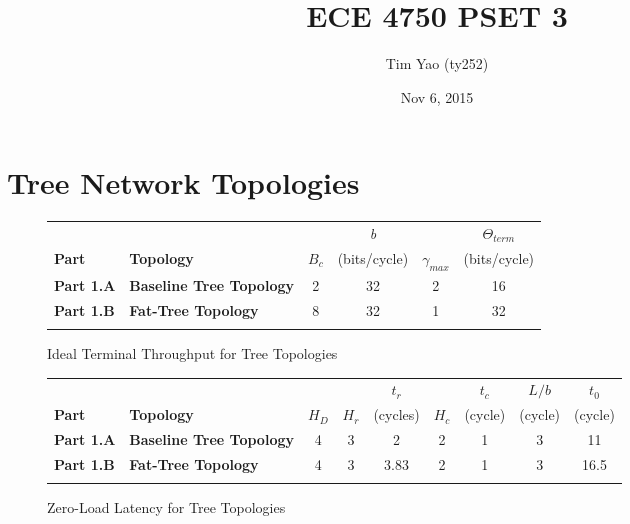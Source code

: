 \documentclass[10pt]{article}
\title{ECE 4750 PSET 3}
\author{Tim Yao (ty252)}
\date{Nov 6, 2015}
\begin{document}
\maketitle
\newcommand*{\tableindent}{\hspace*{0.3cm}}%

\section{Tree Network Topologies} 

\begin{figure}[H]
\centering
\begin{tabular}{@{\extracolsep{3pt}}llcccc@{}}
\Xhline{2\arrayrulewidth}
& & & \textit{b} & & $\Theta_{term}$ \\
\textbf{Part} & \textbf{Topology} & $B_c$ & {(bits/cycle)} & $\gamma_{max}$ & {(bits/cycle)} \\
\hline
\textbf{Part 1.A} & \textbf{Baseline Tree Topology} & 2 & 32 & 2 & 16 \\
\hline
\textbf{Part 1.B} & \textbf{Fat-Tree Topology} & 8 & 32 & 1 & 32  \\
\Xhline{2\arrayrulewidth}
\end{tabular}
\caption{Ideal Terminal Throughput for Tree Topologies}
\end{figure}

\begin{figure}[H]
\centering
\begin{tabular}{@{\extracolsep{3pt}}llccccccc@{}}
\Xhline{2\arrayrulewidth}
& & & & \textit{$t_r$} & & \textit{$t_c$} & \textit{$L/b$} & \textit{$t_0$}\\
\textbf{Part} & \textbf{Topology} & \textit{$H_D$} & \textit{$H_r$} & (cycles) & \textit{$H_c$} & (cycle) & (cycle) & (cycle) \\
\hline
\textbf{Part 1.A} & \textbf{Baseline Tree Topology} & 4 & 3 & 2 & 2 & 1 & 3 & 11\\
\hline
\textbf{Part 1.B} & \textbf{Fat-Tree Topology} & 4 & 3 & 3.83 & 2 & 1 & 3 & 16.5\\
\Xhline{2\arrayrulewidth}
\end{tabular}
\caption{Zero-Load Latency for Tree Topologies}
\end{figure}
\end{document}
